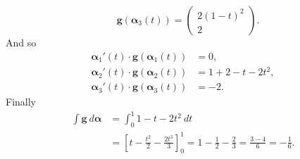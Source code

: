 \begin{solution}
\[        \quad
        \mathbf{g}(\boldsymbol{\alpha}_3(t)) =
        \left(\begin{smallmatrix}
            2 {(1-t)}^2 \\ 2
        \end{smallmatrix}\right).
    \]
    And so
    \[
        \begin{aligned}
            \boldsymbol{\alpha}_1'(t) \cdot \mathbf{g}(\boldsymbol{\alpha}_1(t)) & = 0,               \\
            \boldsymbol{\alpha}_2'(t) \cdot \mathbf{g}(\boldsymbol{\alpha}_2(t)) & = 1 + 2 -t - 2t^2, \\
            \boldsymbol{\alpha}_3'(t) \cdot \mathbf{g}(\boldsymbol{\alpha}_3(t)) & = -2.
        \end{aligned}
    \]
    Finally
    \[
        \begin{aligned}
            \int \mathbf{g} \ d\boldsymbol\alpha
             & = \int_0^1 1  -t - 2t^2 \ dt                           \\
             & = {\left[t - \frac{t^2}{2} - \frac{2 t^3}{3}\right]}_0^1
            = 1 - \frac{1}{2} - \frac{2}{3}
            = \frac{3-4}{6} = - \frac{1}{6}.
        \end{aligned}
    \]
\end{solution}